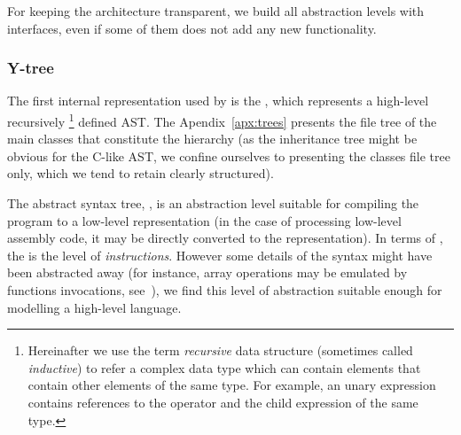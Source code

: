 For keeping the architecture transparent, we build all abstraction levels with interfaces, even if some of them does not add any new functionality.%

\subsubsection{Y-tree}
\label{ch:impl:model:ytree}

The first internal representation used by \porthos[2] is the \textit{\ytree{}}, which represents a high-level recursively%
%
\footnote{Hereinafter we use the term \textit{recursive} data structure (sometimes called \textit{inductive}) to refer a complex data type which can contain elements that contain other elements of the same type.
For example, an unary expression contains references to the operator and the child expression of the same type.} %
%
defined AST.
The Apendix~\ref{apx:trees} presents the file tree of the main classes that constitute the \ytree{} hierarchy (as the inheritance tree might be obvious for the C-like AST, we confine ourselves to presenting the classes file tree only, which we tend to retain clearly structured).

The abstract syntax tree, \ytree{}, is an abstraction level suitable for compiling the program to a low-level representation (in the case of processing low-level assembly code, it may be directly converted to the \xgraph{} representation).
In terms of \porthos[1], the \ytree{} is the level of \textit{instructions}.
However some details of the syntax might have been abstracted away (for instance, array operations may be emulated by functions invocations, see~\cite[Chapter 5]{gries2012science}), we find this level of abstraction suitable enough for modelling a high-level language.

